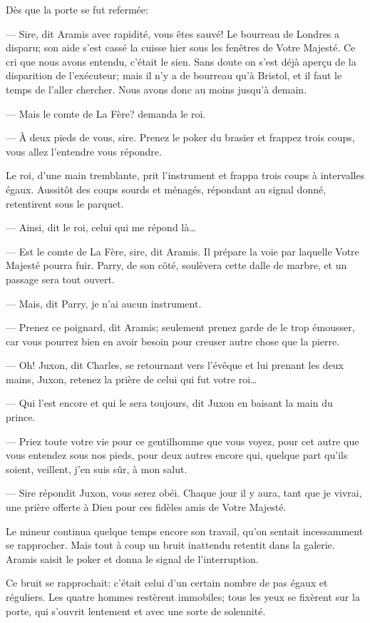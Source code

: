 Dès que la porte se fut refermée:

— Sire, dit Aramis avec rapidité, vous êtes sauvé! Le bourreau de Londres a disparu; son aide s'est cassé la cuisse hier sous les fenêtres de Votre Majesté. Ce cri que nous avons entendu, c'était le sien. Sans doute on s'est déjà aperçu de la disparition de l'exécuteur; mais il n'y a de bourreau qu'à Bristol, et il faut le temps de l'aller chercher. Nous avons donc au moins jusqu'à demain.

— Mais le comte de La Fère? demanda le roi.

— À deux pieds de vous, sire. Prenez le poker du brasier et frappez trois coups, vous allez l'entendre vous répondre.

Le roi, d'une main tremblante, prit l'instrument et frappa trois coups à intervalles égaux. Aussitôt des coups sourds et ménagés, répondant au signal donné, retentirent sous le parquet.

— Ainsi, dit le roi, celui qui me répond là\dots

— Est le comte de La Fère, sire, dit Aramis. Il prépare la voie par laquelle Votre Majesté pourra fuir. Parry, de son côté, soulèvera cette dalle de marbre, et un passage sera tout ouvert.

— Mais, dit Parry, je n'ai aucun instrument.

— Prenez ce poignard, dit Aramis; seulement prenez garde de le trop émousser, car vous pourrez bien en avoir besoin pour creuser autre chose que la pierre.

— Oh! Juxon, dit Charles, se retournant vers l'évêque et lui prenant les deux mains, Juxon, retenez la prière de celui qui fut votre roi\dots

— Qui l'est encore et qui le sera toujours, dit Juxon en baisant la main du prince.

— Priez toute votre vie pour ce gentilhomme que vous voyez, pour cet autre que vous entendez sous nos pieds, pour deux autres encore qui, quelque part qu'ils soient, veillent, j'en suis sûr, à mon salut.

— Sire répondit Juxon, vous serez obéi. Chaque jour il y aura, tant que je vivrai, une prière offerte à Dieu pour ces fidèles amis de Votre Majesté.

Le mineur continua quelque temps encore son travail, qu'on sentait incessamment se rapprocher. Mais tout à coup un bruit inattendu retentit dans la galerie. Aramis saisit le poker et donna le signal de l'interruption.

Ce bruit se rapprochait: c'était celui d'un certain nombre de pas égaux et réguliers. Les quatre hommes restèrent immobiles; tous les yeux se fixèrent sur la porte, qui s'ouvrit lentement et avec une sorte de solennité.

